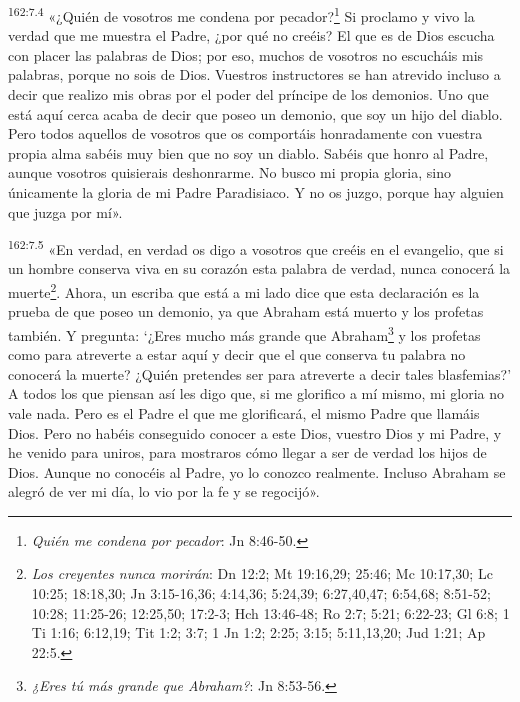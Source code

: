 \par
\textsuperscript{162:7.4} «¿Quién de vosotros me condena por pecador?\footnote{\textit{Quién me condena por pecador}: Jn 8:46-50.} Si proclamo y vivo la verdad que me muestra el Padre, ¿por qué no creéis? El que es de Dios escucha con placer las palabras de Dios; por eso, muchos de vosotros no escucháis mis palabras, porque no sois de Dios. Vuestros instructores se han atrevido incluso a decir que realizo mis obras por el poder del príncipe de los demonios. Uno que está aquí cerca acaba de decir que poseo un demonio, que soy un hijo del diablo. Pero todos aquellos de vosotros que os comportáis honradamente con vuestra propia alma sabéis muy bien que no soy un diablo. Sabéis que honro al Padre, aunque vosotros quisierais deshonrarme. No busco mi propia gloria, sino únicamente la gloria de mi Padre Paradisiaco. Y no os juzgo, porque hay alguien que juzga por mí».

\par
\textsuperscript{162:7.5} «En verdad, en verdad os digo a vosotros que creéis en el evangelio, que si un hombre conserva viva en su corazón esta palabra de verdad, nunca conocerá la muerte\footnote{\textit{Los creyentes nunca morirán}: Dn 12:2; Mt 19:16,29; 25:46; Mc 10:17,30; Lc 10:25; 18:18,30; Jn 3:15-16,36; 4:14,36; 5:24,39; 6:27,40,47; 6:54,68; 8:51-52; 10:28; 11:25-26; 12:25,50; 17:2-3; Hch 13:46-48; Ro 2:7; 5:21; 6:22-23; Gl 6:8; 1 Ti 1:16; 6:12,19; Tit 1:2; 3:7; 1 Jn 1:2; 2:25; 3:15; 5:11,13,20; Jud 1:21; Ap 22:5.}. Ahora, un escriba que está a mi lado dice que esta declaración es la prueba de que poseo un demonio, ya que Abraham está muerto y los profetas también. Y pregunta: `¿Eres mucho más grande que Abraham\footnote{\textit{¿Eres tú más grande que Abraham?}: Jn 8:53-56.} y los profetas como para atreverte a estar aquí y decir que el que conserva tu palabra no conocerá la muerte? ¿Quién pretendes ser para atreverte a decir tales blasfemias?' A todos los que piensan así les digo que, si me glorifico a mí mismo, mi gloria no vale nada. Pero es el Padre el que me glorificará, el mismo Padre que llamáis Dios. Pero no habéis conseguido conocer a este Dios, vuestro Dios y mi Padre, y he venido para uniros, para mostraros cómo llegar a ser de verdad los hijos de Dios. Aunque no conocéis al Padre, yo lo conozco realmente. Incluso Abraham se alegró de ver mi día, lo vio por la fe y se regocijó».

